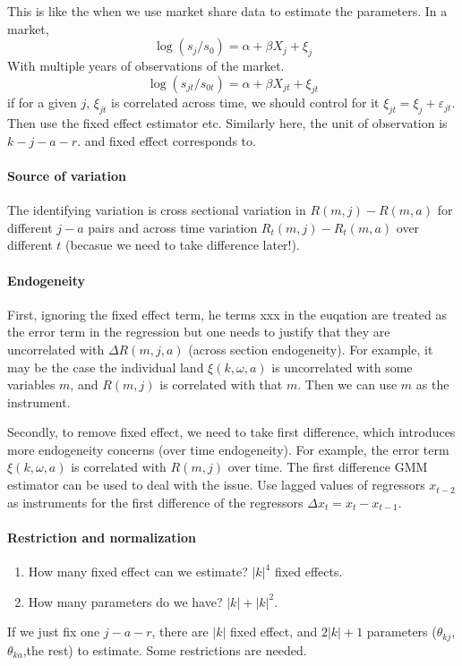 \documentclass[12pt]{article}[margin=1in]
\begin{document}
This is like the when we use market share data to estimate the parameters. In a market,
$$ \log(s_j/s_0)=\alpha+ \beta X_j + \xi_j$$
With multiple years of observations of the market.
$$ \log(s_{jt}/s_{0t}) = \alpha + \beta X_{jt} + \xi_{jt}$$
if for a given $j$, $\xi_{jt}$ is correlated across time, we should control for it $\xi_{jt} = \xi_j + \varepsilon_{jt}$. 
Then use the fixed effect estimator etc. 
Similarly here, the unit of observation is $k-j-a-r$. and fixed effect corresponds to. 

\paragraph{Source of variation} The identifying variation is cross sectional variation in $R(m,j) - R(m,a)$ for different $j-a$ pairs and across time variation $R_t(m,j) - R_t(m,a)$ over different $t$ (becasue we need to take difference later!).

\paragraph{Endogeneity} First, ignoring the fixed effect term, he terms xxx in the euqation are treated as the error term in the regression but one needs to justify that
they are uncorrelated with $\Delta R(m,j,a)$ (across section endogeneity). For example, it may be the case the individual land $\xi(k, \omega, a)$ is uncorrelated with some variables $m$, and $R(m,j)$ is correlated with that $m$. Then we can use $m$ as the instrument. 

Secondly, to remove fixed effect, we need to take first difference, which introduces more endogeneity concerns (over time endogeneity). For example, the error term $\xi(k, \omega, a)$ is correlated with $R(m,j)$ over time. The first difference GMM estimator can be used to deal with the issue. Use lagged values of regressors $x_{t-2}$ as instruments for the first difference of the regressors $\Delta x_{t}=x_{t}-x_{t-1}$.


\paragraph{Restriction and normalization}
\begin{enumerate}
    \item How many fixed effect can we estimate? $|k|^4$ fixed effects.
    \item How many parameters do we have? $|k|+|k|^2$.
\end{enumerate}
If we just fix one $j-a-r$, there are $|k|$ fixed effect, and $2|k|+1$ parameters ($\theta_{kj}$,$\theta_{ka}$,the rest) to estimate. Some restrictions are needed. 
\end{document}
